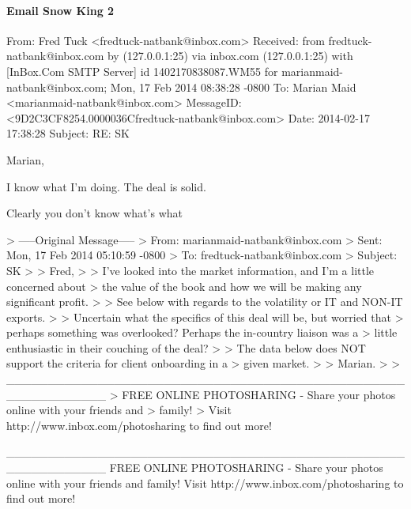 \paragraph{Email Snow King 2}
\label{SnowKing2}
\begin{spverbatim}
From: Fred Tuck <fredtuck-natbank@inbox.com>
Received: from fredtuck-natbank@inbox.com by (127.0.0.1:25) via inbox.com
  (127.0.0.1:25) with [InBox.Com SMTP Server] id 1402170838087.WM55 for
  marianmaid-natbank@inbox.com; Mon, 17 Feb 2014 08:38:28 -0800
To: Marian Maid <marianmaid-natbank@inbox.com>
MessageID: <9D2C3CF8254.0000036Cfredtuck-natbank@inbox.com>
Date: 2014-02-17 17:38:28
Subject: RE: SK

Marian,

I know what I'm doing. The deal is solid.

Clearly you don't know what's what

> -----Original Message-----
> From: marianmaid-natbank@inbox.com
> Sent: Mon, 17 Feb 2014 05:10:59 -0800
> To: fredtuck-natbank@inbox.com
> Subject: SK
> 
> Fred,
> 
> I've looked into the market information, and I'm a little concerned about
> the value of the book and how we will be making any significant profit.
> 
> See below with regards to the volatility or IT and NON-IT exports.
> 
> Uncertain what the specifics of this deal will be, but worried that
> perhaps something was overlooked? Perhaps the in-country liaison was a
> little enthusiastic in their couching of the deal?
> 
> The data below does NOT support the criteria for client onboarding in a
> given market.
> 
> Marian.
> 
> ____________________________________________________________
> FREE ONLINE PHOTOSHARING - Share your photos online with your friends and
> family!
> Visit http://www.inbox.com/photosharing to find out more!

____________________________________________________________
FREE ONLINE PHOTOSHARING - Share your photos online with your friends and family!
Visit http://www.inbox.com/photosharing to find out more!


\end{spverbatim}

